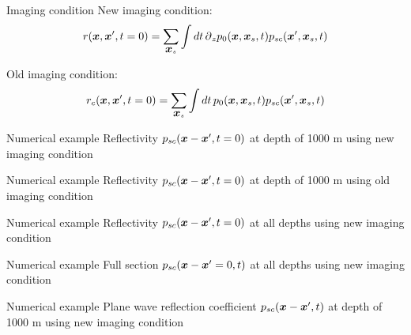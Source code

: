 \documentclass[xcolor=dvipsnames]{beamer}
\begin{document}
\begin{frame}{Imaging condition}
%
New imaging condition:
\begin{eqnarray}
  r(\mbox{\boldmath $x$},\mbox{\boldmath $x$}',t=0)=
    \sum_{\mbox{\boldmath $x$}_s}\int dt\,\mbox{$\partial$}_z {p}_0(\mbox{\boldmath $x$},\mbox{\boldmath $x$}_s,t)p_{sc}(\mbox{\boldmath $x$}',\mbox{\boldmath $x$}_s,t) 
\end{eqnarray}

Old imaging condition:
\begin{eqnarray}
    r_{c}(\mbox{\boldmath $x$},\mbox{\boldmath $x$}',t=0)=\sum_{\mbox{\boldmath $x$}_s}\int dt\, {p}_0(\mbox{\boldmath $x$},\mbox{\boldmath $x$}_s,t)p_{sc}(\mbox{\boldmath $x$}',\mbox{\boldmath $x$}_s,t) 
\end{eqnarray}
%
\end{frame}
\begin{frame}{Numerical example}
Reflectivity $p_{sc}(\mbox{\boldmath $x$}-\mbox{\boldmath $x$}',t=0)$ at depth of 1000 m
using new imaging condition
%
\begin{figure}
\end{figure}
\end{frame}
\begin{frame}{Numerical example}
%
Reflectivity $p_{sc}(\mbox{\boldmath $x$}-\mbox{\boldmath $x$}',t=0)$ at depth of 1000 m
using old imaging condition
\begin{figure}
\end{figure}
\end{frame}
\begin{frame}{Numerical example}
Reflectivity $p_{sc}(\mbox{\boldmath $x$}-\mbox{\boldmath $x$}',t=0)$ at all depths
using new imaging condition
%
\begin{figure}
\end{figure}
\end{frame}
\begin{frame}{Numerical example}
Full section $p_{sc}(\mbox{\boldmath $x$}-\mbox{\boldmath $x$}'=0,t)$ at all depths
using new imaging condition
%
\begin{figure}
\end{figure}
\end{frame}
\begin{frame}{Numerical example}
%
Plane wave reflection coefficient  $p_{sc}(\mbox{\boldmath $x$}-\mbox{\boldmath $x$}',t)$ at depth of 1000 m
using new imaging condition
\begin{figure}
\end{figure}
\end{frame}
\end{document}
